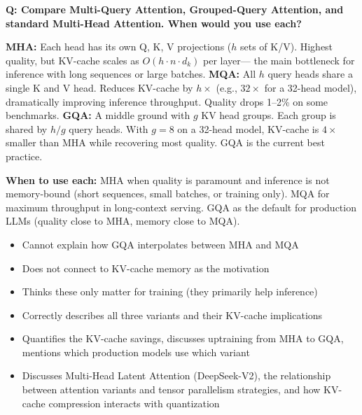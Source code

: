 \bigskip

\begin{interviewq}
\textbf{Q: Compare Multi-Query Attention, Grouped-Query Attention, and standard
Multi-Head Attention. When would you use each?}

 \quad {} \quad \badgefreq{\freqmed}

\stronganswer
\textbf{MHA:} Each head has its own Q, K, V projections ($h$ sets of K/V).
Highest quality, but KV-cache scales as $O(h \cdot n \cdot d_k)$ per layer---
the main bottleneck for inference with long sequences or large batches.
\textbf{MQA:} All $h$ query heads share a single K and V head.  Reduces
KV-cache by $h\times$ (e.g., $32\times$ for a 32-head model), dramatically
improving inference throughput.  Quality drops 1--2\% on some benchmarks.
\textbf{GQA:} A middle ground with $g$ KV head groups.  Each group is shared
by $h/g$ query heads.  With $g = 8$ on a 32-head model, KV-cache is $4\times$
smaller than MHA while recovering most quality.  GQA is the current
best practice.

\textbf{When to use each:} MHA when quality is paramount and inference is
not memory-bound (short sequences, small batches, or training only).  MQA for
maximum throughput in long-context serving.  GQA as the default for production
LLMs (quality close to MHA, memory close to MQA).

\redflags
\begin{itemize}
    \item Cannot explain how GQA interpolates between MHA and MQA
    \item Does not connect to KV-cache memory as the motivation
    \item Thinks these only matter for training (they primarily help inference)
\end{itemize}


\goodgreat
\begin{itemize}
    \item {} Correctly describes all three variants and their KV-cache
          implications
    \item {} Quantifies the KV-cache savings, discusses uptraining
          from MHA to GQA, mentions which production models use which variant
    \item {} Discusses Multi-Head Latent Attention (DeepSeek-V2),
          the relationship between attention variants and tensor parallelism
          strategies, and how KV-cache compression interacts with quantization
\end{itemize}

\end{interviewq}

